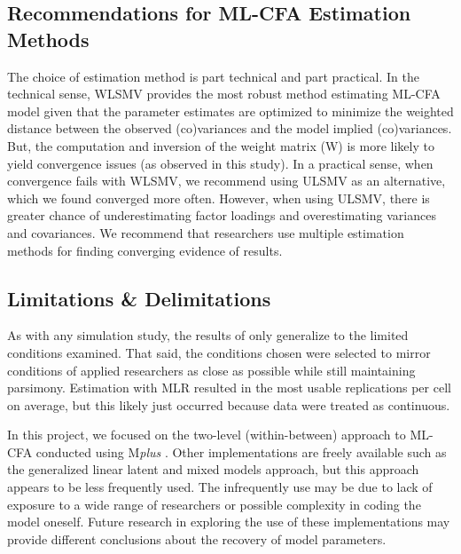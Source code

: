 \documentclass[Review,sageh,times, doublespace]{sagej}
\begin{document}
\subsection{Recommendations for ML-CFA Estimation Methods}

The choice of estimation method is part technical and part practical.
In the technical sense, WLSMV provides the most robust method estimating ML-CFA model given that the parameter estimates are optimized to minimize the weighted distance between the observed (co)variances and the model implied (co)variances.
But, the computation and inversion of the weight matrix (W) is more likely to yield convergence issues (as observed in this study).
In a practical sense, when convergence fails with WLSMV, we recommend using ULSMV as an alternative, which we found converged more often. 
However, when using ULSMV, there is greater chance of underestimating factor loadings and overestimating variances and covariances.
We recommend that researchers use multiple estimation methods for finding converging evidence of results.

\subsection{Limitations \& Delimitations}
As with any simulation study, the results of only generalize to the limited conditions examined. 
That said, the conditions chosen were selected to mirror conditions of applied researchers as close as possible while still maintaining parsimony.
Estimation with MLR resulted in the most usable replications per cell on average, but this likely just occurred because data were treated as continuous. 

In this project, we focused on the two-level (within-between) approach to ML-CFA conducted using M\textit{plus} \citep{Muthen2017}. 
Other implementations are freely available such as the generalized linear latent and mixed models \citep[GLLAMM; ][]{Rabe-Hesketh2007} approach, but this approach appears to be less frequently used. 
The infrequently use may be due to lack of exposure to a wide range of researchers or possible complexity in coding the model oneself.
Future research in exploring the use of these implementations may provide different conclusions about the recovery of model parameters.

\end{document}
